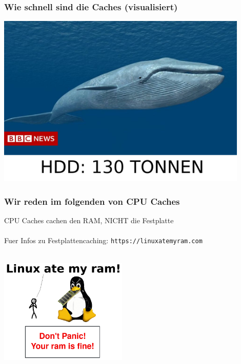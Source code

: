 \documentclass{beamer}
\begin{document}
\begin{frame}
\frametitle{Wie schnell sind die Caches (visualisiert)}
\centerline{\includegraphics[width=12cm]{sizes4.png}}
\end{frame}

{
%
\begin{frame}
\end{frame}
}


\begin{frame}
\frametitle{Wir reden im folgenden von CPU Caches}
{
\centering
CPU Caches cachen den RAM, NICHT die Festplatte\\~\\
}
\pause
Fuer Infos zu Festplattencaching: \texttt{https://linuxatemyram.com}\\~\\
\centerline{\includegraphics[height=5cm]{linuxatemyram.png}}
\end{frame}
\end{document}
